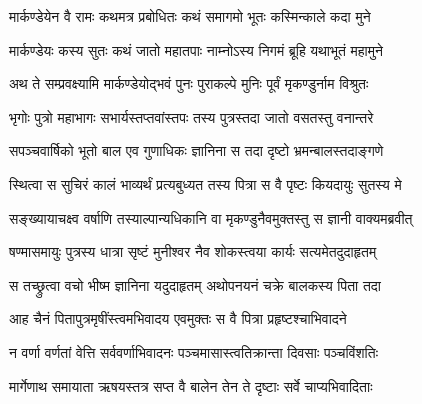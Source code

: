 


\storymeta



\twolineshloka
{मार्कण्डेयेन वै रामः कथमत्र प्रबोधितः}
{कथं समागमो भूतः कस्मिन्काले कदा मुने} %

\twolineshloka
{मार्कण्डेयः कस्य सुतः कथं जातो महातपाः}
{नाम्नोऽस्य निगमं ब्रूहि यथाभूतं महामुने} %

\twolineshloka
{अथ ते सम्प्रवक्ष्यामि मार्कण्डेयोद्भवं पुनः}
{पुराकल्पे मुनिः पूर्वं मृकण्डुर्नाम विश्रुतः} %

\twolineshloka
{भृगोः पुत्रो महाभागः सभार्यस्तप्तवांस्तपः}
{तस्य पुत्रस्तदा जातो वसतस्तु वनान्तरे} %

\twolineshloka
{सपञ्चवार्षिको भूतो बाल एव गुणाधिकः}
{ज्ञानिना स तदा दृष्टो भ्रमन्बालस्तदाङ्गणे} %

\twolineshloka
{स्थित्वा स सुचिरं कालं भाव्यर्थं प्रत्यबुध्यत}
{तस्य पित्रा स वै पृष्टः कियदायुः सुतस्य मे} %

\twolineshloka
{सङ्ख्यायाचक्ष्व वर्षाणि तस्याल्पान्यधिकानि वा}
{मृकण्डुनैवमुक्तस्तु स ज्ञानी वाक्यमब्रवीत्} %

\twolineshloka
{षण्मासमायुः पुत्रस्य धात्रा सृष्टं मुनीश्वर}
{नैव शोकस्त्वया कार्यः सत्यमेतदुदाहृतम्} %

\twolineshloka
{स तच्छ्रुत्वा वचो भीष्म ज्ञानिना यदुदाहृतम्}
{अथोपनयनं चक्रे बालकस्य पिता तदा} %

\twolineshloka
{आह चैनं पितापुत्रमृषींस्त्वमभिवादय}
{एवमुक्तः स वै पित्रा प्रहृष्टश्चाभिवादने} %

\twolineshloka
{न वर्णा वर्णतां वेत्ति सर्ववर्णाभिवादनः}
{पञ्चमासास्त्वतिक्रान्ता दिवसाः पञ्चविंशतिः} %

\twolineshloka
{मार्गेणाथ समायाता ऋषयस्तत्र सप्त वै}
{बालेन तेन ते दृष्टाः सर्वे चाप्यभिवादिताः} %

